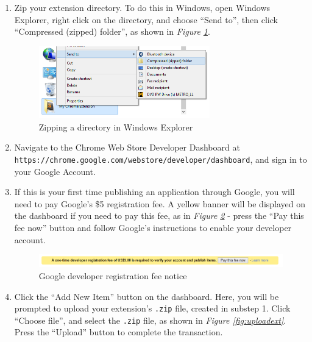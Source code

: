 \documentclass[11pt]{article}
\begin{document}
\begin{enumerate}
	\item Zip your extension directory. To do this in Windows, open Windows Explorer, right click on the directory, and choose ``Send to'', then click ``Compressed (zipped) folder'', as shown in \emph{Figure \ref{fig:zipext}}.\\

	\begin{figure}[htb]
	\centering
	\includegraphics[width=0.7\textwidth]{figures/zipext.png}
	\caption{Zipping a directory in Windows Explorer\label{fig:zipext}}
	\end{figure}

	\item Navigate to the Chrome Web Store Developer Dashboard at \\\texttt{https://chrome.google.com/webstore/developer/dashboard}, and sign in to your Google Account.

	\item If this is your first time publishing an application through Google, you will need to pay Google's \$5 registration fee. A yellow banner will be displayed on the dashboard if you need to pay this fee, as in \emph{Figure \ref{fig:regfee}} - press the ``Pay this fee now'' button and follow Google's instructions to enable your developer account.\\

	\begin{figure}[htb]
	\centering
	\includegraphics[width=1\textwidth]{figures/regfee.png}
	\caption{Google developer registration fee notice\label{fig:regfee}}
	\end{figure}

	\item Click the ``Add New Item'' button on the dashboard. Here, you will be prompted to upload your extension's \texttt{.zip} file, created in substep 1. Click ``Choose file'', and select the \texttt{.zip} file, as shown in \emph{Figure \ref{fig:uploadext}}. Press the ``Upload'' button to complete the transaction.\\


\end{enumerate}
\end{document}
